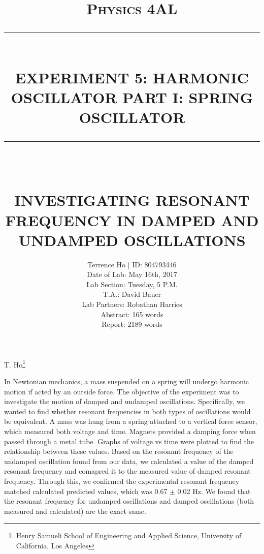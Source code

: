 \documentclass[11pt]{report}
\newcommand{\HRule}[1]{\rule{\linewidth}{#1}}
\begin{document}
\title{ \normalsize \textsc{Physics 4AL}
        \\ [2.0cm]
        \HRule{0.5pt} \\
        \LARGE \textbf{\uppercase{Experiment 5: Harmonic Oscillator Part I:
        Spring Oscillator}}
        \HRule{2pt} \\ [0.5cm]
        \vspace*{2\baselineskip}}

\date{}

\author{
        Terrence Ho | ID: 804793446 \\ 
        Date of Lab: May 16th, 2017 \\
        Lab Section: Tuesday, 5 P.M.\\
        T.A.: David Bauer\\
        Lab Partners: Robathan Harries \\
        Abstract: 165 words\\
        Report: 2189 words\\
    }
\maketitle
\tableofcontents
\newpage

\sectionfont{\scshape}

\begin{center}
\title{
    \Large \textbf{\uppercase{Investigating Resonant Frequency in Damped and Undamped Oscillations}}
}

T. Ho\footnote{Henry Samueli School of Engineering and Applied Science,
University of California, Los Angeles}
\end{center}

In Newtonian mechanics, a mass suspended on a spring will undergo harmonic
motion if acted by an outside force.
The objective of the experiment was to investigate the motion of damped and
undamped oscillations. Specifically, we wanted to find whether
resonant frequencies in both types of oscillations would be equivalent.
A mass was hung from a spring attached to a vertical force sensor, which 
measured both voltage and time. Magnets provided a damping force when passed
through a metal tube. Graphs of voltage vs time were plotted to
find the relationship between these values. Based on the resonant frequency 
of the undamped oscillation found
from our data, we calculated a value of the damped resonant frequency and
comapred it to the measured value of damped resonant frequency.  Through this, 
we confirmed the 
experimental resonant frequency matched calculated predicted values, which was
0.67 $\pm$ 0.02 Hz. We found that
the resonant frequency for undamped oscillations and damped oscillations (both
measured and calculated) are the exact same.  
\end{document}
